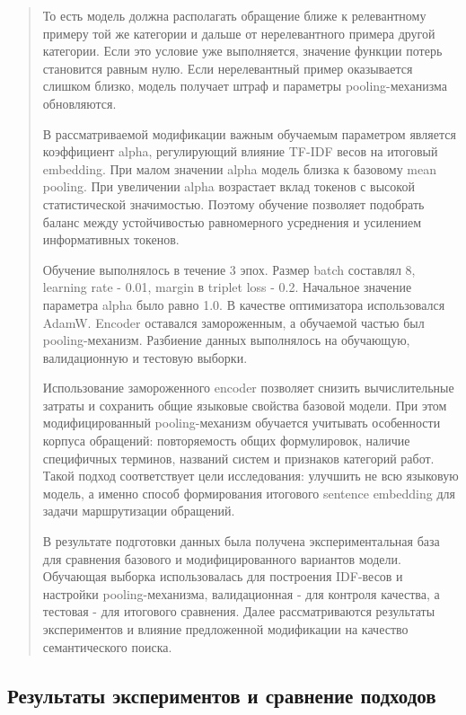 \documentclass[
]{article}
\begin{document}
\begin{quote}
То есть модель должна располагать обращение ближе к релевантному примеру
той же категории и дальше от нерелевантного примера другой категории.
Если это условие уже выполняется, значение функции потерь становится
равным нулю. Если нерелевантный пример оказывается слишком близко,
модель получает штраф и параметры pooling-механизма обновляются.

В рассматриваемой модификации важным обучаемым параметром является
коэффициент alpha, регулирующий влияние TF-IDF весов на итоговый
embedding. При малом значении alpha модель близка к базовому mean
pooling. При увеличении alpha возрастает вклад токенов с высокой
статистической значимостью. Поэтому обучение позволяет подобрать баланс
между устойчивостью равномерного усреднения и усилением информативных
токенов.

Обучение выполнялось в течение 3 эпох. Размер batch составлял 8,
learning rate - 0.01, margin в triplet loss - 0.2. Начальное значение
параметра alpha было равно 1.0. В качестве оптимизатора использовался
AdamW. Encoder оставался замороженным, а обучаемой частью был
pooling-механизм. Разбиение данных выполнялось на обучающую,
валидационную и тестовую выборки.

Использование замороженного encoder позволяет снизить вычислительные
затраты и сохранить общие языковые свойства базовой модели. При этом
модифицированный pooling-механизм обучается учитывать особенности
корпуса обращений: повторяемость общих формулировок, наличие специфичных
терминов, названий систем и признаков категорий работ. Такой подход
соответствует цели исследования: улучшить не всю языковую модель, а
именно способ формирования итогового sentence embedding для задачи
маршрутизации обращений.

В результате подготовки данных была получена экспериментальная база для
сравнения базового и модифицированного вариантов модели. Обучающая
выборка использовалась для построения IDF-весов и настройки
pooling-механизма, валидационная - для контроля качества, а тестовая -
для итогового сравнения. Далее рассматриваются результаты экспериментов
и влияние предложенной модификации на качество семантического поиска.
\end{quote}

\hypertarget{ux440ux435ux437ux443ux43bux44cux442ux430ux442ux44b-ux44dux43aux441ux43fux435ux440ux438ux43cux435ux43dux442ux43eux432-ux438-ux441ux440ux430ux432ux43dux435ux43dux438ux435-ux43fux43eux434ux445ux43eux434ux43eux432}{%
\subsection{Результаты экспериментов и сравнение
подходов}\label{ux440ux435ux437ux443ux43bux44cux442ux430ux442ux44b-ux44dux43aux441ux43fux435ux440ux438ux43cux435ux43dux442ux43eux432-ux438-ux441ux440ux430ux432ux43dux435ux43dux438ux435-ux43fux43eux434ux445ux43eux434ux43eux432}}
\end{document}
